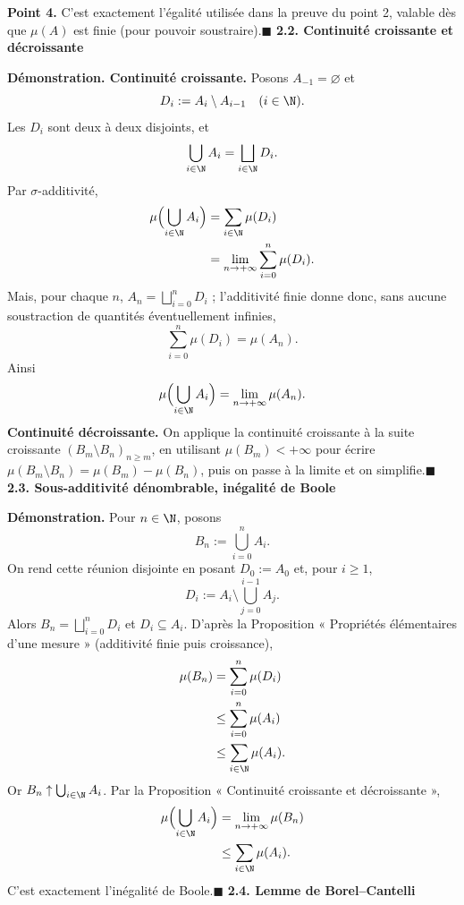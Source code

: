 \textbf{Point 4.} C’est exactement l’égalité utilisée dans la preuve du point 2, valable dès que $\mu(A)$ est finie (pour pouvoir soustraire).\hfill$\blacksquare$
\textbf{2.2. Continuité croissante et décroissante}


\textbf{Démonstration. Continuité croissante.} Posons $A_{-1}=\varnothing$ et
\[D_i:=A_i\setminus A_{i-1}\quad(i\in\N).\]
Les $D_i$ sont deux à deux disjoints, et
\[\bigcup_{i\in\N}A_i=\bigsqcup_{i\in\N}D_i.\]
Par $\sigma$-additivité,
\[
\begin{aligned}
\mu\Bigl(\bigcup_{i\in\N}A_i\Bigr)&=\sum_{i\in\N}\mu(D_i)\\
&=\lim_{n\to+\infty}\sum_{i=0}^n\mu(D_i).
\end{aligned}
\]
Mais, pour chaque $n$, $A_n=\bigsqcup_{i=0}^n D_i$ ; l’additivité finie donne donc, sans aucune soustraction de quantités éventuellement infinies,
\[\sum_{i=0}^n\mu(D_i)=\mu(A_n).\]
Ainsi
\[\mu\Bigl(\bigcup_{i\in\N}A_i\Bigr)=\lim_{n\to+\infty}\mu(A_n).\]
\textbf{Continuité décroissante.} On applique la continuité croissante à la suite croissante $(B_m\setminus B_n)_{n\ge m}$, en utilisant $\mu(B_m)<+\infty$ pour écrire $\mu(B_m\setminus B_n)=\mu(B_m)-\mu(B_n)$, puis on passe à la limite et on simplifie.\hfill$\blacksquare$
\textbf{2.3. Sous-additivité dénombrable, inégalité de Boole}


\textbf{Démonstration.} Pour $n\in\N$, posons
\[B_n:=\bigcup_{i=0}^n A_i.\]
On rend cette réunion disjointe en posant $D_0:=A_0$ et, pour $i\ge1$,
\[D_i:=A_i\setminus\bigcup_{j=0}^{i-1}A_j.\]
Alors $B_n=\bigsqcup_{i=0}^nD_i$ et $D_i\subseteq A_i$. D’après la Proposition « Propriétés élémentaires d’une mesure » (additivité finie puis croissance),
\[
\begin{aligned}
\mu(B_n)&=\sum_{i=0}^n\mu(D_i)\\
&\le\sum_{i=0}^n\mu(A_i)\\
&\le\sum_{i\in\N}\mu(A_i).
\end{aligned}
\]
Or $B_n\uparrow\bigcup_{i\in\N}A_i$. Par la Proposition « Continuité croissante et décroissante »,
\[
\begin{aligned}
\mu\Bigl(\bigcup_{i\in\N}A_i\Bigr)&=\lim_{n\to+\infty}\mu(B_n)\\
&\le\sum_{i\in\N}\mu(A_i).
\end{aligned}
\]
C’est exactement l’inégalité de Boole.\hfill$\blacksquare$
\textbf{2.4. Lemme de Borel–Cantelli}

